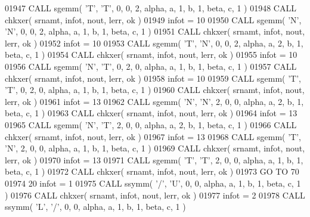 \begin{DoxyCode}
01947       \textcolor{keyword}{CALL }sgemm( \textcolor{stringliteral}{'T'}, \textcolor{stringliteral}{'T'}, 0, 0, 2, alpha, a, 1, b, 1, beta, c, 1 )
01948       \textcolor{keyword}{CALL }chkxer( srnamt, infot, nout, lerr, ok )
01949       infot = 10
01950       \textcolor{keyword}{CALL }sgemm( \textcolor{stringliteral}{'N'}, \textcolor{stringliteral}{'N'}, 0, 0, 2, alpha, a, 1, b, 1, beta, c, 1 )
01951       \textcolor{keyword}{CALL }chkxer( srnamt, infot, nout, lerr, ok )
01952       infot = 10
01953       \textcolor{keyword}{CALL }sgemm( \textcolor{stringliteral}{'T'}, \textcolor{stringliteral}{'N'}, 0, 0, 2, alpha, a, 2, b, 1, beta, c, 1 )
01954       \textcolor{keyword}{CALL }chkxer( srnamt, infot, nout, lerr, ok )
01955       infot = 10
01956       \textcolor{keyword}{CALL }sgemm( \textcolor{stringliteral}{'N'}, \textcolor{stringliteral}{'T'}, 0, 2, 0, alpha, a, 1, b, 1, beta, c, 1 )
01957       \textcolor{keyword}{CALL }chkxer( srnamt, infot, nout, lerr, ok )
01958       infot = 10
01959       \textcolor{keyword}{CALL }sgemm( \textcolor{stringliteral}{'T'}, \textcolor{stringliteral}{'T'}, 0, 2, 0, alpha, a, 1, b, 1, beta, c, 1 )
01960       \textcolor{keyword}{CALL }chkxer( srnamt, infot, nout, lerr, ok )
01961       infot = 13
01962       \textcolor{keyword}{CALL }sgemm( \textcolor{stringliteral}{'N'}, \textcolor{stringliteral}{'N'}, 2, 0, 0, alpha, a, 2, b, 1, beta, c, 1 )
01963       \textcolor{keyword}{CALL }chkxer( srnamt, infot, nout, lerr, ok )
01964       infot = 13
01965       \textcolor{keyword}{CALL }sgemm( \textcolor{stringliteral}{'N'}, \textcolor{stringliteral}{'T'}, 2, 0, 0, alpha, a, 2, b, 1, beta, c, 1 )
01966       \textcolor{keyword}{CALL }chkxer( srnamt, infot, nout, lerr, ok )
01967       infot = 13
01968       \textcolor{keyword}{CALL }sgemm( \textcolor{stringliteral}{'T'}, \textcolor{stringliteral}{'N'}, 2, 0, 0, alpha, a, 1, b, 1, beta, c, 1 )
01969       \textcolor{keyword}{CALL }chkxer( srnamt, infot, nout, lerr, ok )
01970       infot = 13
01971       \textcolor{keyword}{CALL }sgemm( \textcolor{stringliteral}{'T'}, \textcolor{stringliteral}{'T'}, 2, 0, 0, alpha, a, 1, b, 1, beta, c, 1 )
01972       \textcolor{keyword}{CALL }chkxer( srnamt, infot, nout, lerr, ok )
01973       \textcolor{keywordflow}{GO TO} 70
01974    20 infot = 1
01975       \textcolor{keyword}{CALL }ssymm( \textcolor{stringliteral}{'/'}, \textcolor{stringliteral}{'U'}, 0, 0, alpha, a, 1, b, 1, beta, c, 1 )
01976       \textcolor{keyword}{CALL }chkxer( srnamt, infot, nout, lerr, ok )
01977       infot = 2
01978       \textcolor{keyword}{CALL }ssymm( \textcolor{stringliteral}{'L'}, \textcolor{stringliteral}{'/'}, 0, 0, alpha, a, 1, b, 1, beta, c, 1 )

\end{DoxyCode}
